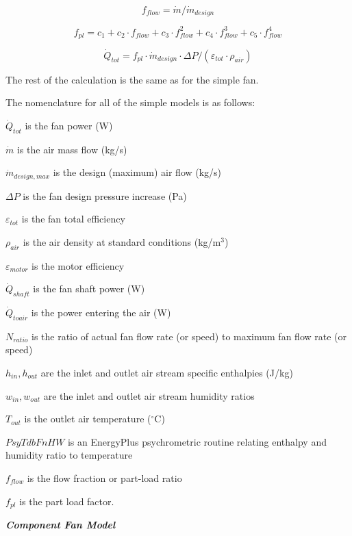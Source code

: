 \begin{equation}
{f_{flow}} = \dot m/{\dot m_{design}}
\end{equation}

\begin{equation}
{f_{pl}} = {c_1} + {c_2} \cdot {f_{flow}} + {c_3} \cdot f_{flow}^2 + {c_4} \cdot f_{flow}^3 + {c_5} \cdot f_{flow}^4
\end{equation}

\begin{equation}
{\dot Q_{tot}} = {f_{pl}}\cdot {\dot m_{design}}\cdot \Delta P/\left( {{\varepsilon_{tot}}\cdot {\rho_{air}}} \right)
\end{equation}

The rest of the calculation is the same as for the simple fan.

The nomenclature for all of the simple models is as follows:

\({\dot Q_{tot}}\) is the fan power (W)

\(\dot m\) is the air mass flow (kg/s)

\({\dot m_{design,max}}\) is the design (maximum) air flow (kg/s)

\(\Delta P\) is the fan design pressure increase (Pa)

\({\varepsilon_{tot}}\) is the fan total efficiency

\({\rho_{air}}\) is the air density at standard conditions (kg/m\(^{3}\))

\({\varepsilon_{motor}}\) is the motor efficiency

\({\dot Q_{shaft}}\) is the fan shaft power (W)

\({\dot Q_{toair}}\) is the power entering the air (W)

\({N_{ratio}}\) is the ratio of actual fan flow rate (or speed) to maximum fan flow rate (or speed)

\({h_{in}},{h_{out}}\) are the inlet and outlet air stream specific enthalpies (J/kg)

\({w_{in}},{w_{out}}\) are the inlet and outlet air stream humidity ratios

\({T_{out}}\) is the outlet air temperature (\(^{\circ}\)C)

\(PsyTdbFnHW\) is an EnergyPlus psychrometric routine relating enthalpy and humidity ratio to temperature

\({f_{flow}}\) is the flow fraction or part-load ratio

\({f_{pl}}\) is the part load factor.

\emph{\textbf{Component Fan Model}}

